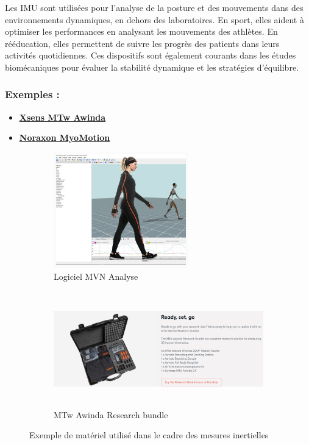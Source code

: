 Les IMU sont utilisées pour l’analyse de la posture et des mouvements dans des environnements dynamiques, en dehors des laboratoires.
En sport, elles aident à optimiser les performances en analysant les mouvements des athlètes. 
En rééducation, elles permettent de suivre les progrès des patients dans leurs activités quotidiennes. 
Ces dispositifs sont également courants dans les études biomécaniques pour évaluer la stabilité dynamique et les stratégies d’équilibre.

\subsubsection{Exemples :}
\begin{itemize}
  \item \href{https://www.movella.com/products/wearables/xsens-mtw-awinda}{\textbf{Xsens MTw Awinda}}
  \item \href{https://www.noraxon.com/products/myomotion/}{\textbf{Noraxon MyoMotion}}
\end{itemize}

\begin{figure}[ht]
  \centering
  \begin{subfigure}[b]{0.45\textwidth}
    \centering
    \includegraphics[height=5cm]{images/xsens.png}
    \caption{Logiciel MVN Analyse}\label{fig:mvn_analyse}
  \end{subfigure}
  \begin{subfigure}[b]{0.45\textwidth}
    \centering
    \includegraphics[height=5cm, width=\textwidth]{images/mtw_awinda.jpg}
    \caption{MTw Awinda Research bundle}\label{fig:MTw_awinda_research}
  \end{subfigure}
  \caption{Exemple de matériel utilisé dans le cadre des mesures inertielles}\label{fig:exemple_mesures_inertielles}
\end{figure}

